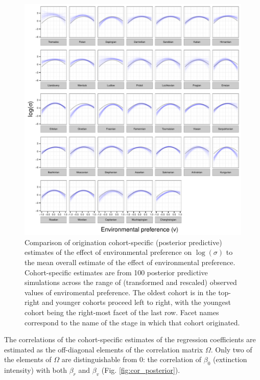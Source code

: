 \documentclass{article}
\begin{document}
\begin{figure}[ht]
  \centering
  \includegraphics[width = \textwidth,height = \textheight,keepaspectratio=true]{figure/env_cohort}
  \caption{Comparison of origination cohort-specific (posterior predictive) estimates of the effect of environmental preference on \(\log(\sigma)\) to the mean overall estimate of the effect of environmental preference. Cohort-specific estimates are from 100 posterior predictive simulations across the range of (transformed and rescaled) observed values of enviromental preference. The oldest cohort is in the top-right and younger cohorts proceed left to right, with the youngest cohort being the right-most facet of the last row. Facet names correspond to the name of the stage in which that cohort originated.}
  \label{fig:env_cohort}
\end{figure}



The correlations of the cohort-specific estimates of the regression coefficients are estimated as the off-diagonal elements of the correlation matrix \(\Omega\). Only two of the elements of \(\Omega\) are distinguishable from 0: the correlation of \(\beta_{0}\) (extinction intensity) with both \(\beta_{r}\) and \(\beta_{v}\) (Fig. \ref{fig:cor_posterior}). 
\end{document}

